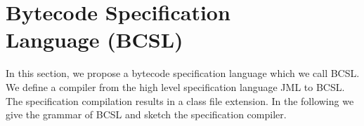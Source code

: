 
\section{Bytecode Specification \\Language (BCSL)}\label{bcSpecLg}
In this section, we propose a bytecode specification language which we call BCSL. We define a compiler from the high level specification language JML to BCSL. The specification compilation results in a class file extension. In the following we give the grammar of BCSL and sketch the specification compiler.



